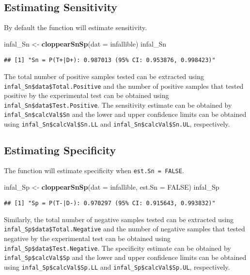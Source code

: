 \documentclass[
  12pt,
]{article}
\newenvironment{Shaded}{\begin{snugshade}}{\end{snugshade}}
\newcommand{\AttributeTok}[1]{\textcolor[rgb]{0.13,0.29,0.53}{#1}}
\newcommand{\ConstantTok}[1]{\textcolor[rgb]{0.56,0.35,0.01}{#1}}
\newcommand{\FunctionTok}[1]{\textcolor[rgb]{0.13,0.29,0.53}{\textbf{#1}}}
\newcommand{\NormalTok}[1]{#1}
\newcommand{\OtherTok}[1]{\textcolor[rgb]{0.56,0.35,0.01}{#1}}
\begin{document}
\subsection{Estimating Sensitivity}\label{estimating-sensitivity}

By default the function will estimate sensitivity.

\begin{Shaded}
\begin{Highlighting}[]
\NormalTok{infal\_Sn }\OtherTok{\textless{}{-}} \FunctionTok{cloppearSnSp}\NormalTok{(}\AttributeTok{dat =}\NormalTok{ infallible)}
\NormalTok{infal\_Sn}
\end{Highlighting}
\end{Shaded}

\begin{verbatim}
## [1] "Sn = P(T+|D+): 0.987013 (95% CI: 0.953876, 0.998423)"
\end{verbatim}

The total number of positive samples tested can be extracted using
\texttt{infal\_Sn\$data\$Total.Positive} and the number of positive
samples that tested positive by the experimental test can be obtained
using \texttt{infal\_Sn\$data\$Test.Positive}. The sensitivity estimate
can be obtained by \texttt{infal\_Sn\$calcVal\$Sn} and the lower and
upper confidence limits can be obtained using
\texttt{infal\_Sn\$calcVal\$Sn.LL} and
\texttt{infal\_Sn\$calcVal\$Sn.UL}, respectively.

\subsection{Estimating Specificity}\label{estimating-specificity}

The function will estimate specificity when \texttt{est.Sn\ =\ FALSE}.

\begin{Shaded}
\begin{Highlighting}[]
\NormalTok{infal\_Sp }\OtherTok{\textless{}{-}} \FunctionTok{cloppearSnSp}\NormalTok{(}\AttributeTok{dat =}\NormalTok{ infallible,}
                         \AttributeTok{est.Sn =} \ConstantTok{FALSE}\NormalTok{)}
\NormalTok{infal\_Sp}
\end{Highlighting}
\end{Shaded}

\begin{verbatim}
## [1] "Sp = P(T-|D-): 0.970297 (95% CI: 0.915643, 0.993832)"
\end{verbatim}

Similarly, the total number of negative samples tested can be extracted
using \texttt{infal\_Sp\$data\$Total.Negative} and the number of
negative samples that tested negative by the experimental test can be
obtained using \texttt{infal\_Sp\$data\$Test.Negative}. The specificity
estimate can be obtained by \texttt{infal\_Sp\$calcVal\$Sp} and the
lower and upper confidence limits can be obtained using
\texttt{infal\_Sp\$calcVal\$Sp.LL} and
\texttt{infal\_Sp\$calcVal\$Sp.UL}, respectively.
\end{document}
